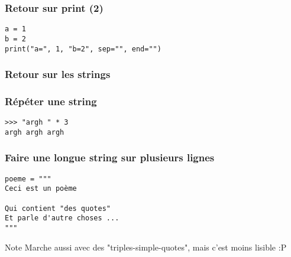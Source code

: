 \documentclass{beamer}
\begin{document}
\begin{frame}[fragile]
  \frametitle{Retour sur print (2)}

\begin{verbatim}
a = 1
b = 2
print("a=", 1, "b=2", sep="", end="")
\end{verbatim}

\end{frame}

\begin{frame}[fragile]
  \frametitle{Retour sur les strings}
\end{frame}

\begin{frame}[fragile]
  \frametitle{Répéter une string}

\begin{verbatim}
>>> "argh " * 3
argh argh argh
\end{verbatim}

\end{frame}


\begin{frame}[fragile]
  \frametitle{Faire une longue string sur plusieurs lignes}

\begin{verbatim}
poeme = """
Ceci est un poème

Qui contient "des quotes"
Et parle d'autre choses ...
"""
\end{verbatim}

\begin{block}{Note}
Marche aussi avec des "triples-simple-quotes", mais c'est moins lisible :P
\end{block}
\end{frame}













\end{document}
